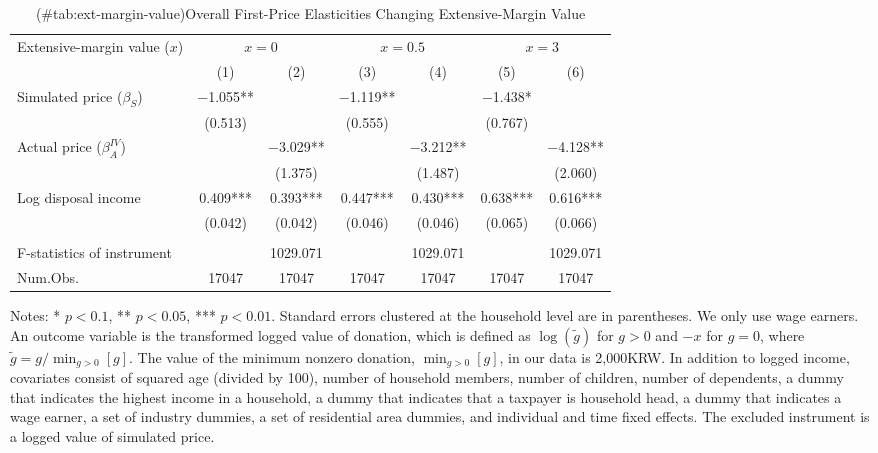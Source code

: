 \begin{table}

\caption{(\#tab:ext-margin-value)Overall First-Price Elasticities Changing Extensive-Margin Value}
\centering
\fontsize{8}{10}\selectfont
\begin{threeparttable}
\begin{tabular}[t]{lcccccc}
\toprule
\multicolumn{1}{c}{Extensive-margin value ($x$)} & \multicolumn{2}{c}{$x = 0$} & \multicolumn{2}{c}{$x = 0.5$} & \multicolumn{2}{c}{$x = 3$} \\
\cmidrule(l{3pt}r{3pt}){1-1} \cmidrule(l{3pt}r{3pt}){2-3} \cmidrule(l{3pt}r{3pt}){4-5} \cmidrule(l{3pt}r{3pt}){6-7}
  & (1) & (2) & (3) & (4) & (5) & (6)\\
\midrule
Simulated price ($\beta_S$) & \num{-1.055}** &  & \num{-1.119}** &  & \num{-1.438}* & \\
 & (\num{0.513}) &  & (\num{0.555}) &  & (\num{0.767}) & \\
Actual price ($\beta^{IV}_A$) &  & \num{-3.029}** &  & \num{-3.212}** &  & \num{-4.128}**\\
 &  & (\num{1.375}) &  & (\num{1.487}) &  & (\num{2.060})\\
Log disposal income & \num{0.409}*** & \num{0.393}*** & \num{0.447}*** & \num{0.430}*** & \num{0.638}*** & \num{0.616}***\\
 & (\num{0.042}) & (\num{0.042}) & (\num{0.046}) & (\num{0.046}) & (\num{0.065}) & (\num{0.066})\\
\midrule
\addlinespace[0.3em]
\multicolumn{7}{l}{\textit{1st stage information (Excluded instrument: Simulated price)}}\\
\hspace{1em}F-statistics of instrument &  & \num{1029.071} &  & \num{1029.071} &  & \num{1029.071}\\
Num.Obs. & \num{17047} & \num{17047} & \num{17047} & \num{17047} & \num{17047} & \num{17047}\\
\bottomrule
\end{tabular}
\begin{tablenotes}
\item Notes: * $p < 0.1$, ** $p < 0.05$, *** $p < 0.01$. Standard errors clustered at the household level are in parentheses. We only use wage earners. An outcome variable is the transformed logged value of donation, which is defined as $\log(\tilde{g})$ for $g > 0$ and $-x$ for $g=0$, where $\tilde{g}=g/\min_{g>0}[g]$. The value of the minimum nonzero donation, $\min_{g>0}[g]$, in our data is 2,000KRW. In addition to logged income, covariates consist of squared age (divided by 100), number of household members, number of children, number of dependents, a dummy that indicates the highest income in a household, a dummy that indicates that a taxpayer is household head, a dummy that indicates a wage earner, a set of industry dummies, a set of residential area dummies, and individual and time fixed effects. The excluded instrument is a logged value of simulated price.
\end{tablenotes}
\end{threeparttable}
\end{table}
